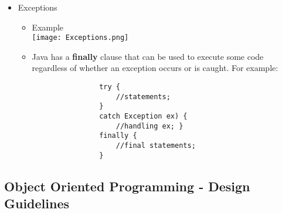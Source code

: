 \documentclass[11pt]{article}
\begin{document}
\begin{itemize}
	\item Exceptions
		\begin{itemize}
			\item Example\\
				\texttt{[image: Exceptions.png]}
			\item Java has a \textbf{finally} clause that can be used to execute some code regardless of whether an exception occurs or is caught. For example:
				\begin{Verbatim}
				try {
					//statements;
				}
				catch Exception ex) {
					//handling ex; }
				finally {
					//final statements;
				}
				\end{Verbatim}
		\end{itemize}
\end{itemize}
	\newpage

\subsection*{Object Oriented Programming - Design Guidelines}
\end{document}
